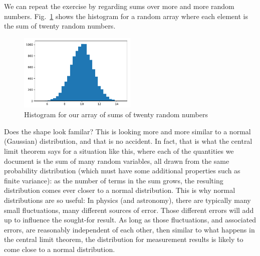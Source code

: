 \documentclass[twocolumn,apj]{openjournal}
\begin{document}
We can repeat the exercise by regarding sums over more and more random numbers. Fig.~\ref{Histo3} shows the histogram for a random array where each element is the sum of twenty random numbers. 
\begin{figure}[htbp]
\begin{center}
\includegraphics[width=0.5\textwidth]{randomfield3.pdf}
\caption{Histogram for our array of sums of twenty random numbers}
\label{Histo3}
\end{center}
\end{figure}
Does the shape look familar? This is looking more and more similar to a normal (Gaussian) distribution, and that is no accident. In fact, that is what the central limit theorem says for a situation like this, where each of the quantities we document is the sum of many random variables, all drawn from the same probability distribution (which must have some additional properties such as finite variance): as the number of terms in the sum grows, the resulting distribution comes ever closer to a normal distribution. This is why normal distributions are so useful: In physics (and astronomy), there are typically many small fluctuations, many different sources of error. Those  different errors will add up to influence the sought-for result. As long as those fluctuations, and associated errors, are reasonably independent of each other, then similar to what happens in the central limit theorem, the distribution for measurement results is likely to come close to a normal distribution.
\end{document}
